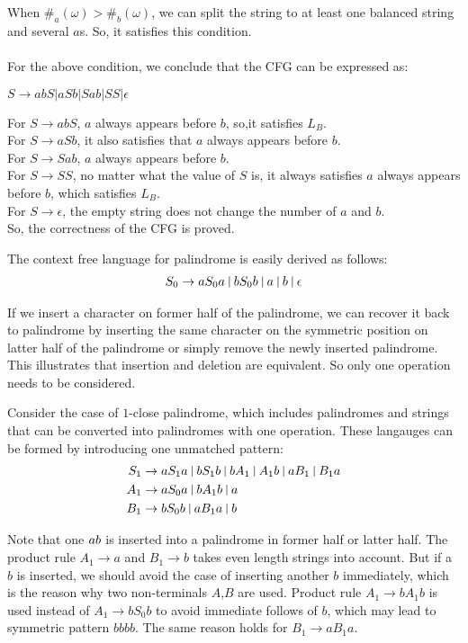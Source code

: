 \documentclass[12pt,a4paper]{article}
\newcommand{\question}[1]{\bigskip\noindent{\textbf{Q{#1} solution}}}
\begin{document}
When $\#_a(\omega) > \#_b(\omega)$, we can split the string to at least one balanced string and 
several $a$s. So, it satisfies this condition.
\\
\question{11.C}
\\For the above condition, we conclude that the CFG can be expressed as:
\begin{center}
  $S \rightarrow abS | aSb | Sab | SS | \epsilon $
\end{center}
For $S \rightarrow abS $, $a$ always appears before $b$, so,it satisfies $L_B$.
\\For $S \rightarrow aSb $, it also satisfies that $a$ always appears before $b$.
\\For $S \rightarrow Sab $, $a$ always appears before $b$.
\\For $S \rightarrow SS $, no matter what the value of $S$ is, it always satisfies
$a$ always appears before $b$, which satisfies $L_B$.
\\For $S \rightarrow \epsilon $, the empty string does not change the number of $a$ and
$b$.
\\So, the correctness of the CFG is proved.
\\
\question{12.A}

The context free language for palindrome is easily derived as follows:
\begin{align}
  S_0 \rightarrow aS_0a\ \vline\ bS_0b\ \vline\ a\ \vline\ b\ \vline\ \epsilon
\end{align}

If we insert a character on former half of the palindrome, we can recover it back to palindrome by inserting the same character on the symmetric position on latter half of the palindrome or simply remove the newly inserted palindrome. This illustrates that insertion and deletion are equivalent. So only one operation needs to be considered.

Consider the case of $1$-close palindrome, which includes palindromes and strings that can be converted into palindromes with one operation. These langauges can be formed by introducing one unmatched pattern:
\begin{align}
  S_1 & \rightarrow aS_1a\ \vline\ bS_1b\ \vline\ bA_1\ \vline\ A_1b\  \vline\ aB_1\ \vline\ B_1a \\
  A_1 &\rightarrow aS_0a\ \vline\ bA_1b\ \vline\ a \\
  B_1 &\rightarrow bS_0b\ \vline\ aB_1a\ \vline\ b
\end{align}

Note that one $a\/b$ is inserted into a palindrome in former half or latter half. The product rule $A_1 \rightarrow a$ and $B_1 \rightarrow b$ takes even length strings into account. But if a $b$ is inserted, we should avoid the case of inserting another $b$ immediately, which is the reason why two non-terminals $A$,$B$ are used. Product rule $A_1 \rightarrow bA_1b$ is used instead of $A_1 \rightarrow bS_0b$ to avoid immediate follows of $b$, which may lead to symmetric pattern $bbbb$. The same reason holds for $B_1 \rightarrow aB_1a$.
\end{document}
